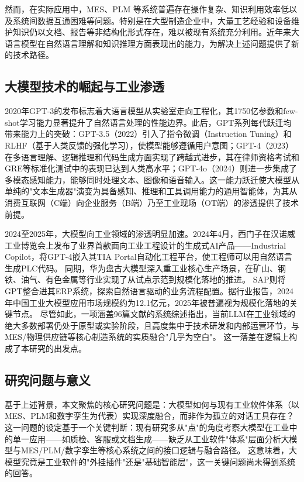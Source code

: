 \documentclass[12pt,a4paper]{ctexart}
\begin{document}
然而，在实际应用中，MES、PLM 等系统普遍存在操作复杂、知识利用效率低以及系统间数据互通困难等问题。特别是在大型制造企业中，大量工艺经验和设备维护知识仍以文档、报告等非结构化形式存在，难以被现有系统充分利用。近年来大语言模型在自然语言理解和知识推理方面表现出的能力，为解决上述问题提供了新的技术路径。
\cite{jms2025llmindustry5}

\subsection{大模型技术的崛起与工业渗透}

2020年GPT-3的发布标志着大语言模型从实验室走向工程化，其1750亿参数和few-shot学习能力显著提升了自然语言处理的性能边界。此后，GPT系列每代跃迁均带来能力上的突破：GPT-3.5（2022）引入了指令微调（Instruction Tuning）和RLHF（基于人类反馈的强化学习），使模型能够遵循用户意图；GPT-4（2023）在多语言理解、逻辑推理和代码生成方面实现了跨越式进步，其在律师资格考试和GRE等标准化测试中的表现已达到人类高水平；GPT-4o（2024）则进一步集成了多模态感知能力，能够同时处理文本、图像和语音输入。这一能力跃迁使大模型从单纯的"文本生成器"演变为具备感知、推理和工具调用能力的通用智能体，为其从消费互联网（C端）向企业服务（B端）乃至工业现场（OT端）的渗透提供了技术前提。\cite{ieee2024llmindustrial}

2024至2025年，大模型向工业领域的渗透明显加速。2024年4月，西门子在汉诺威工业博览会上发布了业界首款面向工业工程设计的生成式AI产品——Industrial Copilot，将GPT-4嵌入其TIA Portal自动化工程平台，使工程师可以用自然语言生成PLC代码。\cite{siemens2024press} 同期，华为盘古大模型深入重工业核心生产场景，在矿山、钢铁、油气、有色金属等行业实现了从试点示范到规模化落地的推进。\cite{huawei2025pangu} SAP则将GPT整合进其ERP系统，探索自然语言驱动的业务流程配置。据行业报告，2024年中国工业大模型应用市场规模约为12.1亿元，2025年被普遍视为规模化落地的关键节点。\cite{hulian2025top10} 尽管如此，一项涵盖96篇文献的系统综述指出，当前LLM在工业领域的绝大多数部署仍处于原型或实验阶段，且高度集中于技术研发和内部运营环节，与MES/物理供应链等核心制造系统的实质融合"几乎为空白"。\cite{ieee2024llmindustrial} 这一落差在逻辑上构成了本研究的出发点。

\subsection{研究问题与意义}

基于上述背景，本文聚焦的核心研究问题是：大模型如何与现有工业软件体系（以MES、PLM和数字孪生为代表）实现深度融合，而非作为孤立的对话工具存在？这一问题的设定基于一个关键判断：现有研究多从"点"的角度考察大模型在工业中的单一应用——如质检、客服或文档生成——缺乏从工业软件"体系"层面分析大模型与MES/PLM/数字孪生等核心系统之间的接口逻辑与融合路径。\cite{ieee2024llmindustrial} 这意味着，大模型究竟是工业软件的"外挂插件"还是"基础智能层"，这一关键问题尚未得到系统的回答。
\end{document}
